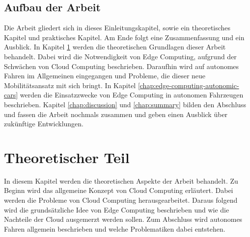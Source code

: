\documentclass{sigchi}
\begin{document}
\subsection{Aufbau der Arbeit}
Die Arbeit gliedert sich in dieses Einleitungskapitel, sowie ein theoretisches Kapitel und praktisches Kapitel. Am Ende folgt eine Zusammenfassung und ein Ausblick. In Kapitel \ref{chap:theoretic-part} werden die theoretischen Grundlagen dieser Arbeit behandelt. Dabei wird die Notwendigkeit von Edge Computing, aufgrund der Schwächen von Cloud Computing beschrieben. Daraufhin wird auf autonomes Fahren im Allgemeinen eingegangen und Probleme, die dieser neue Mobilitätsansatz mit sich bringt. In Kapitel \ref{chap:edge-computing-autonomic-cars} werden die Einsatzzwecke von Edge Computing in autonomen Fahrzeugen beschrieben. Kapitel \ref{chap:discussion} und \ref{chap:summary} bilden den Abschluss und fassen die Arbeit nochmals zusammen und geben einen Ausblick über zukünftige Entwicklungen.

\section{Theoretischer Teil} \label{chap:theoretic-part}
In diesem Kapitel werden die theoretischen Aspekte der Arbeit behandelt. Zu Beginn wird das allgemeine Konzept von Cloud Computing erläutert. Dabei werden die Probleme von Cloud Computing herausgearbeitet. Daraus folgend wird die grundsätzliche Idee von Edge Computing beschrieben und wie die Nachteile der Cloud ausgemerzt werden sollen. Zum Abschluss wird autonomes Fahren allgemein beschrieben und welche Problematiken dabei entstehen.
\end{document}
